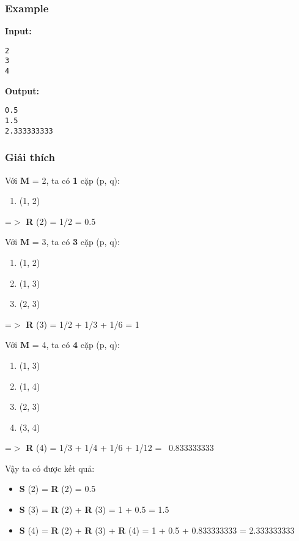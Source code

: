 \subsubsection{   Example  }

\textbf{    Input:   }
\begin{verbatim}
2
3
4
\end{verbatim}

\textbf{    Output:   }
\begin{verbatim}
0.5
1.5
2.333333333\end{verbatim}

\subsubsection{   Giải thích  }

   Với   \textbf{    M   }   = 2, ta có   \textbf{    1   }   cặp (p, q):  
\begin{enumerate}
	\item     (1, 2)   
\end{enumerate}

   =$>$   \textbf{    R   }   (2) = 1/2 = 0.5  

   Với   \textbf{    M   }   = 3, ta có   \textbf{    3   }   cặp (p, q):  
\begin{enumerate}
	\item     (1, 2)   
	\item     (1, 3)   
	\item     (2, 3)   
\end{enumerate}

   =$>$   \textbf{    R   }   (3) = 1/2 + 1/3 + 1/6 = 1  

   Với   \textbf{    M   }   = 4, ta có   \textbf{    4   }   cặp (p, q):  
\begin{enumerate}
	\item     (1, 3)   
	\item     (1, 4)   
	\item     (2, 3)   
	\item     (3, 4)   
\end{enumerate}

   =$>$   \textbf{    R   }   (4) = 1/3 + 1/4 + 1/6 + 1/12 =  0.833333333  

   Vậy ta có được kết quả:  
\begin{itemize}
	\item \textbf{     S    }    (2) =    \textbf{     R    }    (2) = 0.5   
	\item \textbf{     S    }    (3) =    \textbf{     R    }    (2) +    \textbf{     R    }    (3) = 1 + 0.5 = 1.5   
	\item \textbf{     S    }    (4) =    \textbf{     R    }    (2) +    \textbf{     R    }    (3) +    \textbf{     R    }    (4) = 1 + 0.5 + 0.833333333 = 2.333333333   
\end{itemize}